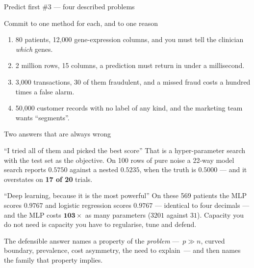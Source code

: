 \documentclass[aspectratio=169]{beamer}
\begin{document}
\begin{frame}[shrink=6]{Predict first \#3 --- four described problems}
  \begin{block}{Commit to one method for each, and to one reason}
    \begin{enumerate}
      \item 80 patients, 12{,}000 gene-expression columns, and you must tell
        the clinician \emph{which} genes.
      \item 2 million rows, 15 columns, a prediction must return in
        under a millisecond.
      \item 3{,}000 transactions, 30 of them fraudulent, and a missed fraud
        costs a hundred times a false alarm.
      \item 50{,}000 customer records with no label of any kind, and the
        marketing team wants ``segments''.
    \end{enumerate}
  \end{block}
\end{frame}

\begin{frame}[shrink=6]{Two answers that are always wrong}
  \begin{alertblock}{``I tried all of them and picked the best score''}
    That is a hyper-parameter search with the test set as the objective. On
    100 rows of pure noise a 22-way model search reports
    $\mathbf{0.5750}$ against a nested $0.5235$, when the truth is $0.5000$
    --- and it overstates on \textbf{17 of 20} trials.
  \end{alertblock}
  \begin{alertblock}{``Deep learning, because it is the most powerful''}
    On these 569 patients the MLP scores $0.9767$ and logistic regression
    scores $0.9767$ --- identical to four decimals --- and the MLP costs
    $\mathbf{103\times}$ as many parameters ($3201$ against $31$). Capacity you do not need is capacity
    you have to regularise, tune and defend.
  \end{alertblock}
  \begin{center}
    \small The defensible answer names a property of the \emph{problem}
    ---~$p \gg n$, curved boundary, prevalence, cost asymmetry, the need to
    explain~--- and then names the family that property implies.
  \end{center}
\end{frame}
\end{document}
